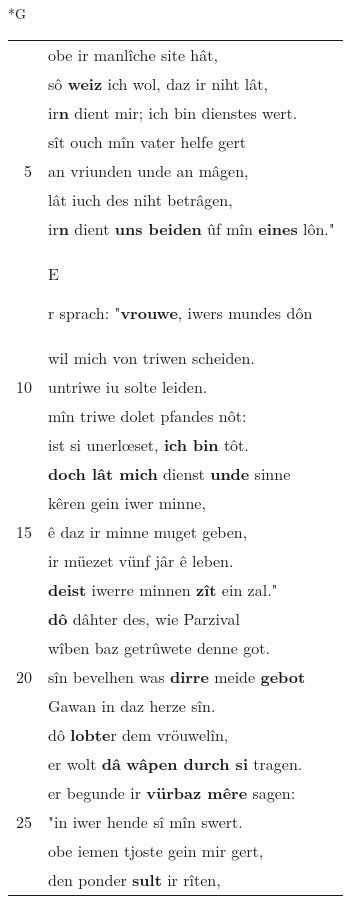 \documentclass[8pt,a4paper,notitlepage]{article}
\begin{document}
\newpage
\begin{table}[ht]
\begin{minipage}[t]{0.5\linewidth}
\small
\begin{center}*G
\end{center}
\begin{tabular}{rl}
 & obe ir manlîche site hât,\\ 
 & sô \textbf{weiz} ich wol, daz ir niht lât,\\ 
 & ir\textbf{n} dient mir; ich bin dienstes wert.\\ 
 & sît ouch mîn vater helfe gert\\ 
5 & an vriunden unde an mâgen,\\ 
 & lât iuch des niht betrâgen,\\ 
 & ir\textbf{n} dient \textbf{uns beiden} ûf mîn \textbf{eines} lôn."\\ 
 & \begin{large}E\end{large}r sprach: "\textbf{vrouwe}, iwers mundes dôn\\ 
 & wil mich von triwen scheiden.\\ 
10 & untriwe iu solte leiden.\\ 
 & mîn triwe dolet pfandes nôt:\\ 
 & ist si unerlœset, \textbf{ich bin} tôt.\\ 
 & \textbf{doch lât mich} dienst \textbf{unde} sinne\\ 
 & kêren gein iwer minne,\\ 
15 & ê daz ir minne muget geben,\\ 
 & ir müezet vünf jâr ê leben.\\ 
 & \textbf{deist} iwerre minnen \textbf{zît} ein zal."\\ 
 & \textbf{dô} dâhter des, wie Parzival\\ 
 & wîben baz getrûwete denne got.\\ 
20 & sîn bevelhen was \textbf{dirre} meide \textbf{gebot}\\ 
 & Gawan in daz herze sîn.\\ 
 & dô \textbf{lobte}r dem vröuwelîn,\\ 
 & er wolt \textbf{dâ} \textbf{wâpen durch si} tragen.\\ 
 & er begunde ir \textbf{vürbaz mêre} sagen:\\ 
25 & "in iwer hende sî mîn swert.\\ 
 & obe iemen tjoste gein mir gert,\\ 
 & den ponder \textbf{sult} ir rîten,\\ 

\end{tabular}
\end{minipage}
\end{table}
\end{document}
